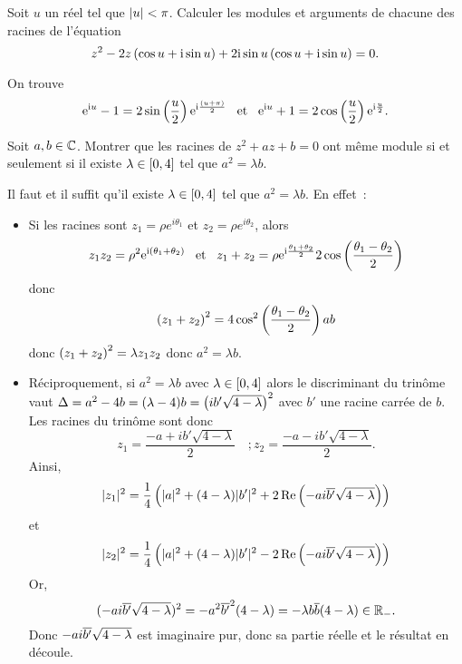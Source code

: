 \documentclass{magnolia}
\begin{document}
Soit $u$ un réel tel que $\left|u\right|<\pi$. Calculer les modules et arguments de
chacune des racines de l'équation
\[z^2-2z\left(\cos u+{\rm i}\sin u\right)+2{\rm i}\sin u\left(\cos u+{\rm i}\sin u\right)=0.\]
\begin{sol}
On trouve
\[{\rm e}^{{\rm i} u}-1=2\sin\left(\frac{u}{2}\right){\rm e}^{{\rm i}\frac{(u+\pi)}{2}} \quad\!\text{et}\quad\!
  {\rm e}^{{\rm i} u}+1=2\cos\left(\frac{u}{2}\right){\rm e}^{{\rm i}\frac{u}{2}}.\]
\end{sol}

Soit $a,b\in\mathbb{C}$. Montrer que les racines de $z^2+az+b=0$ ont même module si et seulement
si il existe $\lambda\in\left[0,4\right]$ tel que $a^2=\lambda b$.

\begin{sol}
Il faut et il suffit qu'il existe $\lambda\in\left[0,4\right]$ tel que
$a^2=\lambda b$. En effet~:
\begin{itemize}
\item Si les racines sont $z_1=\rho e^{i\theta_1}$ et $z_2=\rho e^{i\theta_2}$,
	alors
	\[z_1z_2=\rho^2 {\rm e}^{{\rm i}\left(\theta_1+\theta_2\right)} \quad\!\text{et}\quad\!
		z_1+z_2=\rho {\rm e}^{{\rm i}\frac{\theta_1+\theta_2}{2}}
		2\cos\left(\frac{\theta_1-\theta_2}{2}\right)\]
	donc \[\left(z_1+z_2\right)^2=4\cos^2\left(\frac{\theta_1-\theta_2}{2}\right) ab\]
	donc $\left(z_1+z_2\right)^2=\lambda z_1z_2$ donc $a^2=\lambda b$.
\item Réciproquement, si $a^2=\lambda b$ avec $\lambda\in\left[0,4\right]$ alors le discriminant du trinôme vaut $\Delta=a^2-4b=(\lambda-4)b=\left(ib'\sqrt{4-\lambda}\right)^2$ avec $b'$ une racine carrée de $b$. Les racines du trinôme sont donc $$z_1=\frac{-a+ib'\sqrt{4-\lambda}}{2} \quad ; z_2=\frac{-a-ib'\sqrt{4-\lambda}}{2}.$$
Ainsi, $$|z_1|^2=\frac{1}{4}\left(|a|^2+(4-\lambda)|b'|^2+2\mathop{\rm Re}\left(-ai\overline{b'}\sqrt{4-\lambda}\right)\right)$$ et $$|z_2|^2=\frac{1}{4}\left(|a|^2+(4-\lambda)|b'|^2-2\mathop{\rm Re}\left(-ai\overline{b'}\sqrt{4-\lambda}\right)\right)$$
Or, $$(-ai\overline{b'}\sqrt{4-\lambda})^2=-a^2\overline{b'}^2(4-\lambda)=-\lambda b\overline{b}(4-\lambda)\in\mathbb{R}_-.$$
Donc $-ai\overline{b'}\sqrt{4-\lambda}$ est imaginaire pur, donc sa partie réelle et le résultat en découle.
\end{itemize}
\end{sol}

\end{document}
